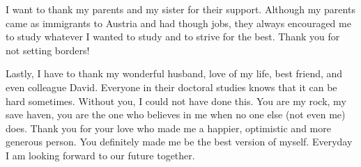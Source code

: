 I want to thank my parents and my sister for their support. Although my parents came as immigrants to Austria and had though jobs, they always encouraged me to study whatever I wanted to study and to strive for the best. Thank you for not setting borders!

Lastly, I have to thank my wonderful husband, love of my life, best friend, and even colleague David. Everyone in their doctoral studies knows that it can be hard sometimes. Without you, I could not have done this. You are my rock, my save haven, you are the one who believes in me when no one else (not even me) does. Thank you for your love who made me a happier, optimistic and more generous person. You definitely made me be the best version of myself. Everyday I am looking forward to our future together.
